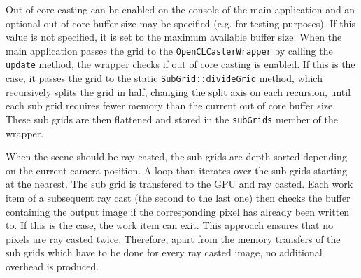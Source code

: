 Out of core casting can be enabled on the console of the main application and an optional out of core buffer size may be specified (e.g. for testing purposes). If this value is not specified, it is set to the maximum available buffer size. When the main application passes the grid to the \lstinline!OpenCLCasterWrapper!  by calling the \lstinline!update! method, the wrapper checks if out of core casting is enabled. If this is the case, it passes the grid to the static \lstinline!SubGrid::divideGrid! method, which recursively splits the grid in half, changing the split axis on each recursion, until each sub grid requires fewer memory than the current out of core buffer size. These sub grids are then flattened and stored in the \lstinline!subGrids! member of the wrapper.

When the scene should be ray casted, the sub grids are depth sorted depending on the current camera position. A loop than iterates over the sub grids starting at the nearest. The sub grid is transfered to the GPU and ray casted. Each work item of a subsequent ray cast (the second to the last one) then checks the buffer containing the output image if the corresponding pixel has already been written to. If this is the case, the work item can exit. This approach ensures that no pixels are ray casted twice. Therefore, apart from the memory transfers of the sub grids which have to be done for every ray casted image, no additional overhead is produced. 
